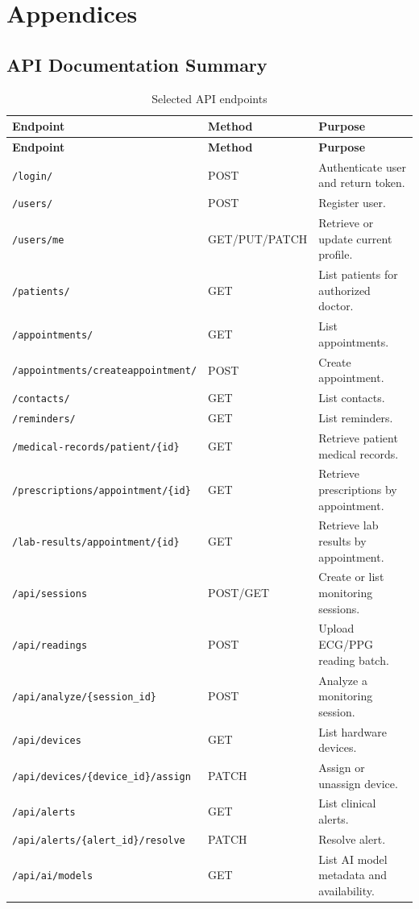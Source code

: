\chapter{Appendices}

\section{API Documentation Summary}

\begin{longtable}{p{} p{} p{}}
\caption{Selected API endpoints}\\
\toprule
\textbf{Endpoint} & \textbf{Method} & \textbf{Purpose}\\
\midrule
\endfirsthead
\toprule
\textbf{Endpoint} & \textbf{Method} & \textbf{Purpose}\\
\midrule
\endhead
\texttt{/login/} & POST & Authenticate user and return token.\\
\texttt{/users/} & POST & Register user.\\
\texttt{/users/me} & GET/PUT/PATCH & Retrieve or update current profile.\\
\texttt{/patients/} & GET & List patients for authorized doctor.\\
\texttt{/appointments/} & GET & List appointments.\\
\texttt{/appointments/createappointment/} & POST & Create appointment.\\
\texttt{/contacts/} & GET & List contacts.\\
\texttt{/reminders/} & GET & List reminders.\\
\texttt{/medical-records/patient/\{id\}} & GET & Retrieve patient medical records.\\
\texttt{/prescriptions/appointment/\{id\}} & GET & Retrieve prescriptions by appointment.\\
\texttt{/lab-results/appointment/\{id\}} & GET & Retrieve lab results by appointment.\\
\texttt{/api/sessions} & POST/GET & Create or list monitoring sessions.\\
\texttt{/api/readings} & POST & Upload ECG/PPG reading batch.\\
\texttt{/api/analyze/\{session\_id\}} & POST & Analyze a monitoring session.\\
\texttt{/api/devices} & GET & List hardware devices.\\
\texttt{/api/devices/\{device\_id\}/assign} & PATCH & Assign or unassign device.\\
\texttt{/api/alerts} & GET & List clinical alerts.\\
\texttt{/api/alerts/\{alert\_id\}/resolve} & PATCH & Resolve alert.\\
\texttt{/api/ai/models} & GET & List AI model metadata and availability.\\
\bottomrule
\end{longtable}

